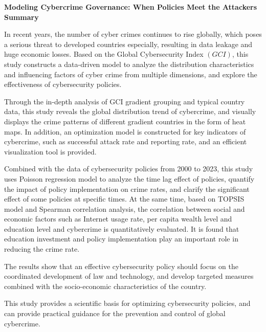 \documentclass[12pt]{article}
\begin{document}
\begin{center}
	\fontsize{16}{19}\selectfont \textbf{Modeling Cybercrime Governance: When Policies Meet the Attackers} \\
	\bigskip
	\fontsize{16}{19}\selectfont \textbf{Summary} \\
\end{center}
\begin{adjustwidth}{2em}{2em}
	\hspace*{1.5em} In recent years, the number of cyber crimes continues to rise globally,
	which poses a serious threat to developed countries especially, resulting in data leakage and huge economic losses.
	Based on the Global Cybersecurity Index $(GCI)$,
	this study constructs a data-driven model to analyze the distribution characteristics and influencing factors of cyber crime from multiple dimensions,
	and explore the effectiveness of cybersecurity policies.

	Through the in-depth analysis of GCI gradient grouping and typical country data,
	this study reveals the global distribution trend of cybercrime,
	and visually displays the crime patterns of different gradient countries in the form of heat maps.
	In addition, an optimization model is constructed for key indicators of cybercrime,
	such as successful attack rate and reporting rate, and an efficient visualization tool is provided.

	Combined with the data of cybersecurity policies from 2000 to 2023,
	this study uses Poisson regression model to analyze the time lag effect of policies, quantify the impact of policy implementation on crime rates,
	and clarify the significant effect of some policies at specific times.
	At the same time, based on TOPSIS model and Spearman correlation analysis,
	the correlation between social and economic factors such as Internet usage rate, per capita wealth level and education level and cybercrime is quantitatively evaluated.
	It is found that education investment and policy implementation play an important role in reducing the crime rate.

	The results show that an effective cybersecurity policy should focus on the coordinated development of law and technology,
	and develop targeted measures combined with the socio-economic characteristics of the country.

	This study provides a scientific basis for optimizing cybersecurity policies,
	and can provide practical guidance for the prevention and control of global cybercrime.


\end{adjustwidth}
\end{document}
